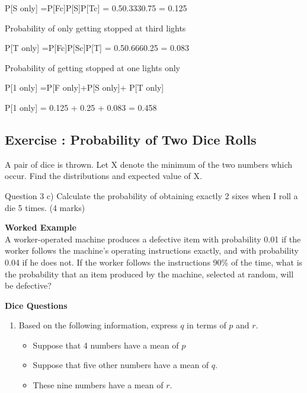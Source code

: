 P[S only] =P[Fc]P[S]P[Tc] = 0.50.3330.75 = 0.125








Probability of only getting stopped at third  lights

P[T only] =P[Fc]P[Sc]P[T] = 0.50.6660.25 = 0.083


Probability of getting stopped at one lights only 


P[1 only] =P[F only]+P[S only]+ P[T only]


P[1 only] = 0.125 + 0.25 + 0.083 = 0.458






\subsection{Exercise : Probability of Two Dice Rolls}
A pair of dice is thrown. Let X denote the minimum of the two numbers which occur.
Find the distributions and expected value of X.








Question 3
c) Calculate the probability of obtaining exactly 2 sixes when I roll a die 5 times.
(4 marks)

\noindent \textbf{Worked Example}\\
A worker-operated machine produces a defective item with probability 0.01 if the worker follows the machine’s operating instructions exactly, and with probability 0.04 if he does not. If the worker follows the instructions 90\% of the time, what is the probability that an item produced by the machine, selected at random, will be defective?







\textbf{Dice Questions}
\begin{enumerate}

\item Based on the following information, express $q$ in terms of $p$ and $r$.
\begin{itemize}
\item Suppose that 4 numbers have a mean of $p$
\item Suppose that five other numbers have a mean of $q$.
\item These nine numbers have a mean of $r$.
\end{itemize}


\end{enumerate}

